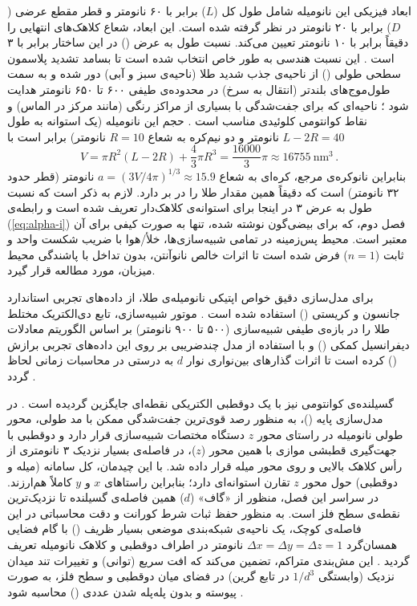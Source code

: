 \documentclass[12pt,a4paper]{report}
\begin{document}
ابعاد فیزیکی این نانومیله شامل طول کل ($L$) برابر با ۶۰ نانومتر و قطر مقطع عرضی ($D$) برابر با ۲۰ نانومتر در نظر گرفته شده است. این ابعاد، شعاع کلاهک‌های انتهایی را دقیقاً برابر با ۱۰ نانومتر تعیین می‌کند. نسبت طول به عرض () در این ساختار برابر با ۳ است \cite{maier}. این نسبت هندسی به طور خاص انتخاب شده است تا بسامد تشدید پلاسمون سطحی طولی () از ناحیه‌ی جذب شدید طلا (ناحیه‌ی سبز و آبی) دور شده و به سمت طول‌موج‌های بلندتر (انتقال به سرخ) در محدوده‌ی طیفی ۶۰۰ تا ۶۵۰ نانومتر هدایت شود \cite{maier,novotny}؛ ناحیه‌ای که برای جفت‌شدگی با بسیاری از مراکز رنگی (مانند مرکز  در الماس) و نقاط کوانتومی کلوئیدی مناسب است \cite{novotny}. حجم این نانومیله (یک استوانه به طول $L-2R=40$ نانومتر و دو نیم‌کره به شعاع $R=10$ نانومتر) برابر است با
\[
V=\pi R^2(L-2R)+\frac{4}{3}\pi R^3=\frac{16000}{3}\pi\approx16755\ \mathrm{nm}^3\,.\] بنابراین نانوکره‌ی مرجع، کره‌ای به شعاع $a=(3V/4\pi)^{1/3}\approx15.9$ نانومتر (قطر حدود ۳۲ نانومتر) است که دقیقاً همین مقدار طلا را در بر دارد. لازم به ذکر است که نسبت طول به عرض ۳ در اینجا برای استوانه‌ی کلاهک‌دار تعریف شده است و رابطه‌ی (\ref{eq:alpha-i}) فصل دوم، که برای بیضی‌گون نوشته شده، تنها به صورت کیفی برای آن معتبر است. محیط پس‌زمینه در تمامی شبیه‌سازی‌ها، خلأ/هوا با ضریب شکست واحد و ثابت ($n=1$) فرض شده است تا اثرات خالص نانوآنتن، بدون تداخل با پاشندگی محیط میزبان، مورد مطالعه قرار گیرد.

برای مدل‌سازی دقیق خواص اپتیکی نانومیله‌ی طلا، از داده‌های تجربی استاندارد جانسون و کریستی () استفاده شده است \cite{jc}. موتور شبیه‌سازی، تابع دی‌الکتریک مختلط طلا را در بازه‌ی طیفی شبیه‌سازی (۵۰۰ تا ۹۰۰ نانومتر) بر اساس الگوریتم معادلات دیفرانسیل کمکی () و با استفاده از مدل چندضریبی بر روی این داده‌های تجربی برازش () کرده است تا اثرات گذارهای بین‌نواری نوار $d$ به درستی در محاسبات زمانی لحاظ گردد \cite{maier,taflove}.

گسیلنده‌ی کوانتومی نیز با یک دوقطبی الکتریکی نقطه‌ای جایگزین گردیده است \cite{novotny}. در مدل‌سازی پایه ()، به منظور رصد قوی‌ترین جفت‌شدگی ممکن با مد طولی، محور طولی نانومیله در راستای محور $z$ دستگاه مختصات شبیه‌سازی قرار دارد و دوقطبی با جهت‌گیری قطبشی موازی با همین محور ($z$)، در فاصله‌ی بسیار نزدیک ۳ نانومتری از رأس کلاهک بالایی و روی محور میله قرار داده شد. با این چیدمان، کل سامانه (میله و دوقطبی) حول محور $z$ تقارن استوانه‌ای دارد؛ بنابراین راستاهای $x$ و $y$ کاملاً هم‌ارزند. در سراسر این فصل، منظور از «گاف» ($d$) همین فاصله‌ی گسیلنده تا نزدیک‌ترین نقطه‌ی سطح فلز است. به منظور حفظ ثبات شرط کورانت و دقت محاسباتی در این فاصله‌ی کوچک، یک ناحیه‌ی شبکه‌بندی موضعی بسیار ظریف () با گام فضایی همسان‌گرد $\Delta x=\Delta y=\Delta z=1$ نانومتر در اطراف دوقطبی و کلاهک نانومیله تعریف گردید \cite{taflove}. این مش‌بندی متراکم، تضمین می‌کند که افت سریع (توانی) و تغییرات تند میدان نزدیک (وابستگی $1/d^3$ در تابع گرین) در فضای میان دوقطبی و سطح فلز، به صورت پیوسته و بدون پله‌پله شدن عددی () محاسبه شود \cite{novotny,taflove}.
\end{document}
